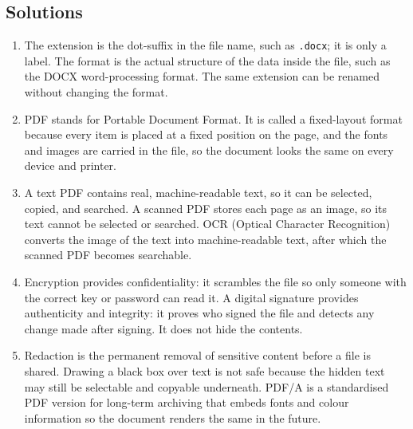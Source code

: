 \documentclass[11pt]{article}
\begin{document}
\subsection*{Solutions}
\begingroup\small
\begin{enumerate}[label=\arabic*.]
  \item The extension is the dot-suffix in the file name, such as
    \texttt{.docx}; it is only a label. The format is the actual structure of
    the data inside the file, such as the DOCX word-processing format. The
    same extension can be renamed without changing the format.
  \item PDF stands for Portable Document Format. It is called a fixed-layout
    format because every item is placed at a fixed position on the page, and
    the fonts and images are carried in the file, so the document looks the
    same on every device and printer.
  \item A text PDF contains real, machine-readable text, so it can be
    selected, copied, and searched. A scanned PDF stores each page as an
    image, so its text cannot be selected or searched. OCR (Optical Character
    Recognition) converts the image of the text into machine-readable text,
    after which the scanned PDF becomes searchable.
  \item Encryption provides confidentiality: it scrambles the file so only
    someone with the correct key or password can read it. A digital signature
    provides authenticity and integrity: it proves who signed the file and
    detects any change made after signing. It does not hide the contents.
  \item Redaction is the permanent removal of sensitive content before a file
    is shared. Drawing a black box over text is not safe because the hidden
    text may still be selectable and copyable underneath. PDF/A is a
    standardised PDF version for long-term archiving that embeds fonts and
    colour information so the document renders the same in the future.
\end{enumerate}
\endgroup
\end{document}
